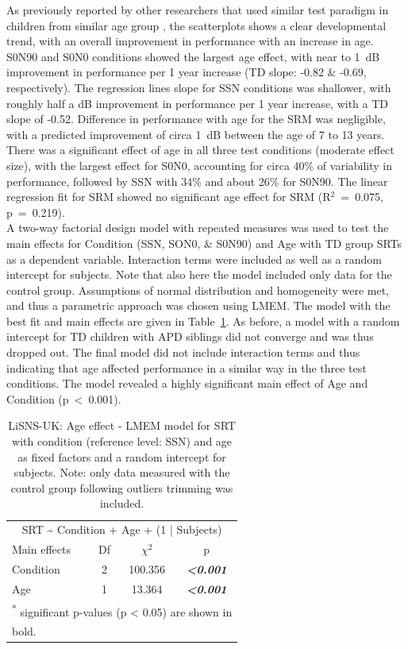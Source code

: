 \documentclass[a4paper, twoside]{templates/ociamthesis}
\begin{document}
As previously reported by other researchers that used similar test paradigm in children from similar age group \autocites[e.g.,][]{Cameron2007,Murphy2019}, the scatterplots shows a clear developmental trend, with an overall improvement in performance with an increase in age. S0N90 and S0N0 conditions showed the largest age effect, with near to 1~dB improvement in performance per 1 year increase (TD slope: -0.82 \& -0.69, respectively). The regression lines slope for SSN conditions was shallower, with roughly half a dB improvement in performance per 1 year increase, with a TD slope of -0.52. Difference in performance with age for the SRM was negligible, with a predicted improvement of circa 1~dB between the age of 7 to 13 years. There was a significant effect of age in all three test conditions (moderate effect size), with the largest effect for S0N0, accounting for circa 40\% of variability in performance, followed by SSN with 34\% and about 26\% for S0N90. The linear regression fit for SRM showed no significant age effect for SRM (R\(^{2}\)~=~0.075, p~=~0.219).\\

A two-way factorial design model with repeated measures was used to test the main effects for Condition (SSN, SON0, \& S0N90) and Age with TD group SRTs as a dependent variable. Interaction terms were included as well as a random intercept for subjects. Note that also here the model included only data for the control group. Assumptions of normal distribution and homogeneity were met, and thus a parametric approach was chosen using LMEM. The model with the best fit and main effects are given in Table~\ref{tab:LiSNS-AgeLMEMTab}. As before, a model with a random intercept for TD children with APD siblings did not converge and was thus dropped out. The final model did not include interaction terms and thus indicating that age affected performance in a similar way in the three test conditions. The model revealed a highly significant main effect of Age and Condition (p~\textless~0.001).

\begin{table}

\caption{\label{tab:LiSNS-AgeLMEMTab}LiSNS-UK: Age effect - LMEM model for SRT with condition (reference level: SSN) and age as fixed factors and a random intercept for subjects. Note: only data measured with the control group following outliers trimming was included.}
\centering
\begin{tabular}[t]{lcc>{}c}
\toprule
\multicolumn{4}{c}{SRT \textasciitilde{} Condition + Age + (1 | Subjects)} \\
\cmidrule(l{3pt}r{3pt}){1-4}
Main effects & Df & $\chi^{2}$ & p\\
\midrule
Condition & 2 & 100.356 & \em{\textbf{<0.001}}\\
Age & 1 & 13.364 & \em{\textbf{<0.001}}\\
\bottomrule
\multicolumn{4}{l}{\textsuperscript{*} significant p-values (p < 0.05) are shown in}\\
\multicolumn{4}{l}{bold.}\\
\end{tabular}
\end{table}
\end{document}
